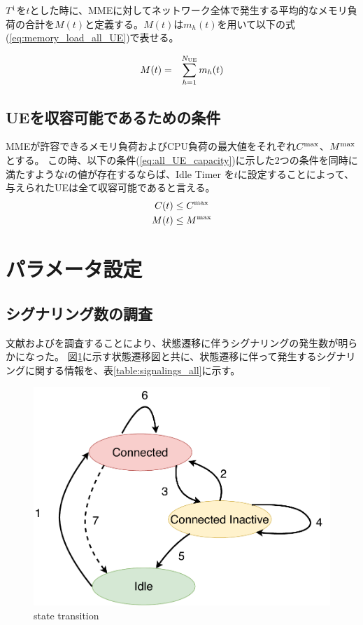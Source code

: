\documentclass[a4j]{ujarticle}
\begin{document}
$T^{\rm i}$を$t$とした時に、MMEに対してネットワーク全体で発生する平均的なメモリ負荷の合計を$M(t)$と定義する。$M(t)$は$m_h(t)$を用いて以下の式(\ref{eq:memory_load_all_UE})で表せる。

\begin{eqnarray}
  M(t) & = & \sum_{h = 1}^{N_{\rm UE}} m_h(t) \label{eq:memory_load_all_UE}
\end{eqnarray}

\subsection{UEを収容可能であるための条件}
MMEが許容できるメモリ負荷およびCPU負荷の最大値をそれぞれ$C^{\rm max}$、$M^{\rm max}$とする。
この時、以下の条件(\ref{eq:all_UE_capacity})に示した2つの条件を同時に満たすような$t$の値が存在するならば、Idle Timer を$t$に設定することによって、与えられたUEは全て収容可能であると言える。
\begin{eqnarray}
\begin{split}
  C(t) &\le C^{\rm max}
  \\ M(t) &\le M^{\rm max}
  \label{eq:all_UE_capacity}
\end{split}
\end{eqnarray}

\section{パラメータ設定}
\subsection{シグナリング数の調査}
\label{seq:mme_signaling}
文献\cite{3gpp.23.720}および\cite{ANovelStateModelfor5GRadioAccessNetworks}を調査することにより、状態遷移に伴うシグナリングの発生数が明らかになった。
図\ref{state_id}に示す状態遷移図と共に、状態遷移に伴って発生するシグナリングに関する情報を、表\ref{table:signalings_all}に示す。

\begin{figure}[htbp]
  \centering
  \includegraphics[width=0.9\hsize]{state_id.pdf}
  \caption{state transition}
  \label{state_id}
\end{figure}
\end{document}
